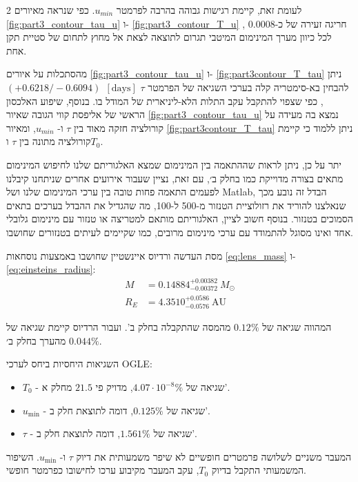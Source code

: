 \documentclass{article}
\begin{document}
\begin{multicols}{2}
לעומת זאת, קיימת רגישות גבוהה בהרבה לפרמטר
$u_{min}$. 
כפי שנראה מאיורים 
\ref{fig:part3_contour_tau_u}
ו-
\ref{fig:part3_contour_T_u}
, חריגה זעירה של כ-0.0008 לכל כיוון מערך המינימום המיטבי תגרום לתוצאה לצאת אל מחוץ לתחום של סטיית תקן אחת.

מהסתכלות על איורים 
\ref{fig:part3_contour_tau_u}
ו-
\ref{fig:part3contour_T_tau}
ניתן להבחין בא-סימטריה קלה בערכי השגיאה של הפרמטר
$\tau$
\mbox{$(+0.6218 / -0.6094)\:\:[\text{days}]$ },
כפי שצפוי להתקבל עקב התלות הלא-ליניארית של המודל בו.
בנוסף, שיפוע האלכסון הראשי של אליפסת קווי הגובה שאיור
\ref{fig:part3_contour_tau_u} 
נמצא בה מעידה על קורולציה חזקה מאוד בין  
$\tau$
ו- 
$u_{min}$, 
ומאיור
\ref{fig:part3contour_T_tau}
ניתן ללמוד כי קיימת קורולציה מתונה בין $\tau$ ו$T_0$.

יתר על כן, ניתן לראות שההתאמה בין המינימום שמצא האלגוריתם שלנו לחיפוש המינימום מתאים בצורה מדוייקת כמו בחלק ב׳, 
עם זאת,
נציין שעבור אירועים אחרים שניתחנו קיבלנו לפעמים התאמה פחות טובה בין ערכי המינימום שלנו ושל 
\textenglish{Matlab},
הבדל זה נובע מכך שנאלצנו להוריד את רזולוציית הטנזור מ-500 ל-100, מה שהגדיל את ההבדל בערכים בתאים הסמוכים בטנזור.
בנוסף חשוב לציין, האלגוריתם מותאם למטריצה או טנזור עם מינימום גלובלי אחד ואינו מסוגל להתמודד עם ערכי מינימום מרובים, כמו שקיימים לעיתים בטנזורים שחושבו.


מסת העדשה ורדיוס איינשטיין שחושבו באמצעות נוסחאות
\ref{eq:lens_mass}
ו-
\ref{eq:einsteins_radius}:
\begin{align}
M &= 0.14884^{+0.00382}_{-0.00372}\ M_{\odot} \\
R_E &= 4.3510^{+0.0586}_{-0.0576}\ \text{AU}
\end{align}


המהווה שגיאה של
$0.12\%$
מהמסה שהתקבלה בחלק ב'.
ועבור הרדיוס קיימת שגיאה של 
$0.044\%$
מהערך בחלק ב׳.

השגיאות היחסיות ביחס לערכי
\textenglish{OGLE}:
\begin{itemize}[label=$\bullet$]
    \item $T_0$ - שגיאה של $4.07 \cdot 10^{-8}\%$,
    מדויק פי
    $21.5$
    מחלק א'.
    \item $u_{\min}$ - שגיאה של $0.125\%$,
    דומה לתוצאת חלק ב'.
    \item $\tau$ - שגיאה של $1.561\%$,
    דומה לתוצאת חלק ב'.
\end{itemize}

המעבר משניים לשלושה פרמטרים חופשיים לא שיפר משמעותית את דיוק
$\tau$
ו-
$u_{\min}$.
השיפור המשמעותי התקבל בדיוק
$T_0$,
עקב המעבר מקיבוע ערכו לחישובו כפרמטר חופשי.




\end{multicols}
\end{document}
